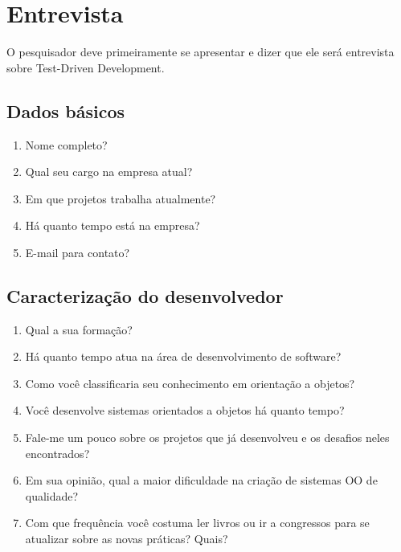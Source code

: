 \chapter{Entrevista}
\label{ape:entrevista}

O pesquisador deve primeiramente se apresentar e dizer que ele será entrevista
sobre Test-Driven Development.

\section{Dados básicos}
\label{entrevista:dados-basicos}

\begin{enumerate}
	\item Nome completo?

	\item Qual seu cargo na empresa atual?
	
	\item Em que projetos trabalha atualmente?
	
	\item Há quanto tempo está na empresa?

	\item E-mail para contato?

\end{enumerate}

\section{Caracterização do desenvolvedor}
\label{entrevista:caracterizacao}

\begin{enumerate}
	\item Qual a sua formação?

	\item Há quanto tempo atua na área de desenvolvimento de software?

	\item Como você classificaria seu conhecimento em orientação a objetos?

	\item Você desenvolve sistemas orientados a objetos há quanto tempo?	

	\item Fale-me um pouco sobre os projetos que já desenvolveu e os desafios 
	neles encontrados?

	\item Em sua opinião, qual a maior dificuldade na criação de sistemas OO de
	qualidade?

	\item Com que frequência você costuma ler livros ou ir a congressos para se 
	atualizar sobre as novas práticas? Quais?

\end{enumerate}

